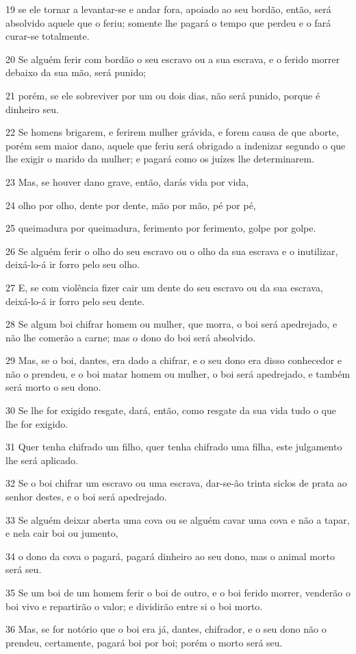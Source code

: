 \par 19 se ele tornar a levantar-se e andar fora, apoiado ao seu bordão, então, será absolvido aquele que o feriu; somente lhe pagará o tempo que perdeu e o fará curar-se totalmente.
\par 20 Se alguém ferir com bordão o seu escravo ou a sua escrava, e o ferido morrer debaixo da sua mão, será punido;
\par 21 porém, se ele sobreviver por um ou dois dias, não será punido, porque é dinheiro seu.
\par 22 Se homens brigarem, e ferirem mulher grávida, e forem causa de que aborte, porém sem maior dano, aquele que feriu será obrigado a indenizar segundo o que lhe exigir o marido da mulher; e pagará como os juízes lhe determinarem.
\par 23 Mas, se houver dano grave, então, darás vida por vida,
\par 24 olho por olho, dente por dente, mão por mão, pé por pé,
\par 25 queimadura por queimadura, ferimento por ferimento, golpe por golpe.
\par 26 Se alguém ferir o olho do seu escravo ou o olho da sua escrava e o inutilizar, deixá-lo-á ir forro pelo seu olho.
\par 27 E, se com violência fizer cair um dente do seu escravo ou da sua escrava, deixá-lo-á ir forro pelo seu dente.
\par 28 Se algum boi chifrar homem ou mulher, que morra, o boi será apedrejado, e não lhe comerão a carne; mas o dono do boi será absolvido.
\par 29 Mas, se o boi, dantes, era dado a chifrar, e o seu dono era disso conhecedor e não o prendeu, e o boi matar homem ou mulher, o boi será apedrejado, e também será morto o seu dono.
\par 30 Se lhe for exigido resgate, dará, então, como resgate da sua vida tudo o que lhe for exigido.
\par 31 Quer tenha chifrado um filho, quer tenha chifrado uma filha, este julgamento lhe será aplicado.
\par 32 Se o boi chifrar um escravo ou uma escrava, dar-se-ão trinta siclos de prata ao senhor destes, e o boi será apedrejado.
\par 33 Se alguém deixar aberta uma cova ou se alguém cavar uma cova e não a tapar, e nela cair boi ou jumento,
\par 34 o dono da cova o pagará, pagará dinheiro ao seu dono, mas o animal morto será seu.
\par 35 Se um boi de um homem ferir o boi de outro, e o boi ferido morrer, venderão o boi vivo e repartirão o valor; e dividirão entre si o boi morto.
\par 36 Mas, se for notório que o boi era já, dantes, chifrador, e o seu dono não o prendeu, certamente, pagará boi por boi; porém o morto será seu.

